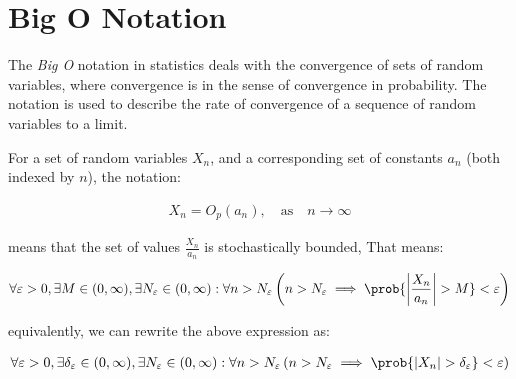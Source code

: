 \section{Big O Notation}
\label{sec:big-O}

The \emph{Big O} notation in statistics deals with the convergence of sets of random variables, where convergence is in the sense of convergence in probability. The notation is used to describe the rate of convergence of a sequence of random variables to a limit.

For a set of random variables $X_n$, and a corresponding set of constants $a_n$ (both indexed by $n$), the notation:

\begin{align*}
    X_n = O_p(a_n), \quad \text{as} \quad n \to \infty
\end{align*}

means that the set of values $\frac{X_n}{a_n}$ is stochastically bounded, That means:

\begin{align*}
\forall \varepsilon > 0, 
\exists M \in (0, \infty),
\exists N_{\varepsilon} \in (0, \infty): 
    \forall n > N_{\varepsilon} \left(
        n > N_{\varepsilon} \implies \prob{
            \left|
                \frac{X_n}{a_n}
            \right| > M
        } < \varepsilon
    \right)
\end{align*}

equivalently, we can rewrite the above expression as:

\begin{align*}
\forall \varepsilon > 0, 
\exists \delta_{\varepsilon} \in (0, \infty),
\exists N_{\varepsilon} \in (0, \infty): 
    \forall n > N_{\varepsilon} \left(
        n > N_{\varepsilon} \implies \prob{
            \left|
                X_n
            \right| > \delta_{\varepsilon}
        } < \varepsilon
    \right)
\end{align*}

